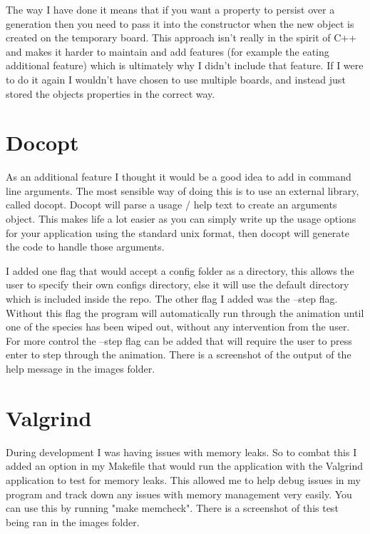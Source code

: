 \documentclass[10pt]{article}
\begin{document}
  The way I have done it means that if you want a property to persist over a generation then you need to pass it into the constructor when the new object is created on the temporary board. This approach isn't really in the spirit of C++ and makes it harder to maintain and add features (for example the eating additional feature) which is ultimately why I didn't include that feature. If I were to do it again I wouldn't have chosen to use multiple boards, and instead just stored the objects properties in the correct way. 

  \section{Docopt}
  As an additional feature I thought it would be a good idea to add in command line arguments. The most sensible way of doing this is to use an external library, called docopt. Docopt will parse a usage / help text to create an arguments object. This makes life a lot easier as you can simply write up the usage options for your application using the standard unix format, then docopt will generate the code to handle those arguments.

  I added one flag that would accept a config folder as a directory, this allows the user to specify their own configs directory, else it will use the default directory which is included inside the repo. The other flag I added was the --step flag. Without this flag the program will automatically run through the animation until one of the species has been wiped out, without any intervention from the user. For more control the --step flag can be added that will require the user to press enter to step through the animation. There is a screenshot of the output of the help message in the images folder. 

  \section{Valgrind}
  During development I was having issues with memory leaks. So to combat this I added an option in my Makefile that would run the application with the Valgrind application to test for memory leaks. This allowed me to help debug issues in my program and track down any issues with memory management very easily. You can use this by running "make memcheck".
  There is a screenshot of this test being ran in the images folder. 
\end{document}
